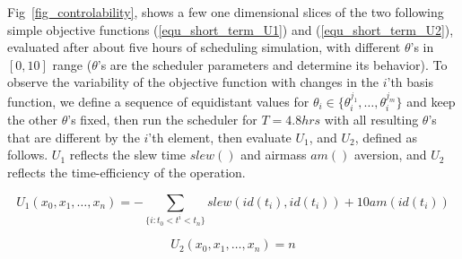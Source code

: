 \documentclass[12pt]{aastex62}
\theoremstyle{definition}
\begin{document}
Fig~\ref{fig_controlability}, shows a few one dimensional slices of the two following simple objective functions (\ref{equ_short_term_U1}) and (\ref{equ_short_term_U2}), evaluated after about five hours of scheduling simulation, with different $\theta$'s in $[0,10]$ range ($\theta$'s are the scheduler parameters and determine its behavior). To observe the variability of the objective function with changes in the $i$'th basis function, we define a sequence of equidistant values for $\theta_i \in \{\theta_i^{j_1},\dots,\theta_i^{j_m}\}$ and keep the other $\theta$'s fixed, then run the scheduler for $T = 4.8 hrs$ with all resulting $\theta$'s that are different by the $i$'th element, then evaluate $U_1$, and $U_2$, defined as follows. $U_1$ reflects the slew time $slew()$ and airmass $am()$ aversion, and $U_2$ reflects the time-efficiency of the operation.

\begin{equation}\label{equ_short_term_U1}
U_1(x_0,x_{1}, \dots, x_{n})= -\sum_{\{i:t_0<t^i<t_n\}} {slew(id(t_{i}), id(t_i)) + 10 am(id(t_i))}
\end{equation}

\begin{equation}\label{equ_short_term_U2}
U_2(x_0,x_{1}, \dots, x_{n})= n
\end{equation}
\end{document}
